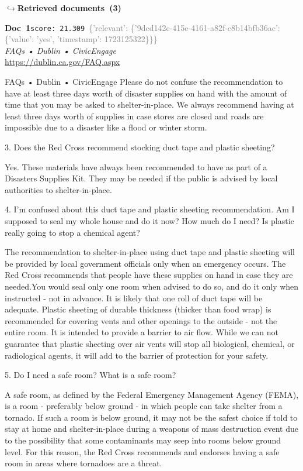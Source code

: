 \documentclass[a4paper,11pt]{article}
\begin{document}
\noindent\hfill{\footnotesize\textcolor{doccolor}{\textbf{$\hookrightarrow$\enspace Retrieved documents~(3)}}}
\begin{docenv}
{\footnotesize\textcolor{doccolor}{\textbf{Doc~1}}}\hfill{\tiny\texttt{score:~21.309}}\ {\tiny\textcolor{gray}{\{'relevant': \{'9dcd142c-415e-4161-a82f-c8b14bfb36ac': \{'value': 'yes', 'timestamp': 1723125322\}\}\}}}\\[3pt]
{\small\textit{FAQs • Dublin • CivicEngage}}\\[2pt]
{\tiny\url{https://dublin.ca.gov/FAQ.aspx}}\\[4pt]
{\footnotesize FAQs • Dublin • CivicEngage
Please do not confuse the recommendation to have at least three days worth of disaster supplies on hand with the amount of time that you may be asked to shelter-in-place. We always recommend having at least three days worth of supplies in case stores are closed and roads are impossible due to a disaster like a flood or winter storm. 	

3.
Does the Red Cross recommend stocking duct tape and plastic sheeting?

Yes. These materials have always been recommended to have as part of a Disasters Supplies Kit. They may be needed if the public is advised by local authorities to shelter-in-place.	

4.
I'm confused about this duct tape and plastic sheeting recommendation. Am I supposed to seal my whole house and do it now? How much do I need? Is plastic really going to stop a chemical agent?

The recommendation to shelter-in-place using duct tape and plastic sheeting will be provided by local government officials only when an emergency occurs. The Red Cross recommends that people have these supplies on hand in case they are needed.You would seal only one room when advised to do so, and do it only when instructed - not in advance. It is likely that one roll of duct tape will be adequate. Plastic sheeting of durable thickness (thicker than food wrap) is recommended for covering vents and other openings to the outside - not the entire room. It is intended to provide a barrier to air flow. While we can not guarantee that plastic sheeting over air vents will stop all biological, chemical, or radiological agents, it will add to the barrier of protection for your safety.	

5.
Do I need a safe room? What is a safe room?

A safe room, as defined by the Federal Emergency Management Agency (FEMA), is a room - preferably below ground - in which people can take shelter from a tornado. If such a room is below ground, it may not be the safest choice if told to stay at home and shelter-in-place during a weapons of mass destruction event due to the possibility that some contaminants may seep into rooms below ground level. For this reason, the Red Cross recommends and endorses having a safe room in areas where tornadoes are a threat.}
\end{docenv}
\end{document}
